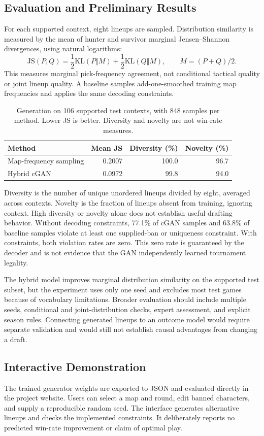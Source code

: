 \subsection{Evaluation and Preliminary Results}
For each supported context, eight lineups are sampled. Distribution similarity
is measured by the mean of hunter and survivor marginal Jensen--Shannon
divergences, using natural logarithms:
\begin{equation}
\mathrm{JS}(P,Q)=\frac{1}{2}\mathrm{KL}(P\Vert M)
               +\frac{1}{2}\mathrm{KL}(Q\Vert M),
\qquad M=(P+Q)/2.
\end{equation}
This measures marginal pick-frequency agreement, not conditional tactical
quality or joint lineup quality. A baseline samples add-one-smoothed training
map frequencies and applies the same decoding constraints.

\begin{table}[htbp]
\centering
\caption{Generation on 106 supported test contexts, with 848 samples per method.
Lower JS is better. Diversity and novelty are not win-rate measures.}
\label{tab:gan}
\begin{tabular}{lrrr}
\toprule
Method & Mean JS & Diversity (\%) & Novelty (\%) \\
\midrule
Map-frequency sampling & 0.2007 & 100.0 & 96.7 \\
Hybrid cGAN & 0.0972 & 99.8 & 94.0 \\
\bottomrule
\end{tabular}
\end{table}

Diversity is the number of unique unordered lineups divided by eight, averaged
across contexts. Novelty is the fraction of lineups absent from training,
ignoring context. High diversity or novelty alone does not establish useful
drafting behavior. Without decoding constraints, 77.1\% of cGAN samples and
63.8\% of baseline samples violate at least one supplied-ban or uniqueness
constraint. With constraints, both violation rates are zero. This zero rate
is guaranteed by the decoder and is not evidence that the GAN independently
learned tournament legality.

The hybrid model improves marginal distribution similarity on the supported
test subset, but the experiment uses only one seed and excludes most test
games because of vocabulary limitations. Broader evaluation should include
multiple seeds, conditional and joint-distribution checks, expert assessment,
and explicit season rules. Connecting generated lineups to an outcome model
would require separate validation and would still not establish causal
advantages from changing a draft.

\subsection{Interactive Demonstration}
The trained generator weights are exported to JSON and evaluated directly in
the project website. Users can select a map and round, edit banned characters,
and supply a reproducible random seed. The interface generates alternative
lineups and checks the implemented constraints. It deliberately reports no
predicted win-rate improvement or claim of optimal play.
